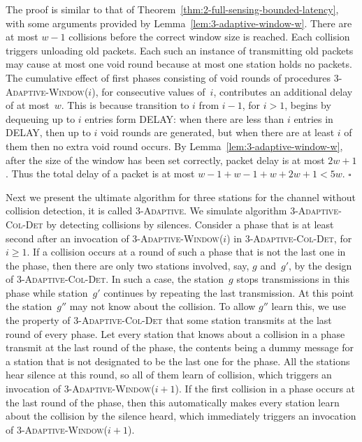 \documentclass[11pt]{article}
\newcommand{\qed}{\hfill $\square$ \smallbreak}
\newenvironment{proof}{\noindent{\bf Proof:}}{\qed}
\begin{document}
\begin{proof}
The proof is similar to that of Theorem~\ref{thm:2-full-sensing-bounded-latency}, with some arguments provided by Lemma~\ref{lem:3-adaptive-window-w}.
There are at most $w-1$ collisions before the correct window size is reached.
Each collision triggers unloading old packets.
Each such an instance of transmitting old packets may cause at most one void round because at most one station holds no packets.
The cumulative effect of first phases consisting of void rounds of procedures \textsc{3-Adaptive-Window($i$)}, for consecutive values of~$i$, contributes an additional delay of at most~$w$.
This is because transition to $i$ from $i-1$, for $i>1$, begins by dequeuing up to $i$ entries form DELAY: when there are less than $i$ entries in DELAY, then up to $i$ void rounds are generated, but when there are at least $i$ of them then no extra void round occurs.
By Lemma~\ref{lem:3-adaptive-window-w}, after the size of the window has been set correctly, packet delay is at most $2w+1$.
Thus the total delay of a packet is at most $w-1+w-1+w +2w+1 < 5w$.
\end{proof}


Next we present the ultimate algorithm for three stations for the channel without collision detection, it is called \textsc{3-Adaptive}.
We simulate algorithm \textsc{3-Adaptive-Col-Det} by detecting collisions by silences.
Consider a phase that is at least second after an invocation of \textsc{3-Adaptive-Window($i$)} in \textsc{3-Adaptive-Col-Det}, for $i\ge 1$.
If a collision occurs at a round of such a phase that is not the last one in the phase, then there are only two stations involved, say, $g$ and~$g'$, by the design of \textsc{3-Adaptive-Col-Det}.
In such a case, the station~$g$ stops transmissions in this phase while station~$g'$ continues by repeating the last transmission.
At this point the station~$g''$ may not know about the collision.
To allow $g''$ learn this, we use the property of \textsc{3-Adaptive-Col-Det} that some station transmits at the last round of every phase.
Let every station that knows about a collision in a phase transmit at the last round of the phase, the contents being a dummy message for a station that is not designated to be the last one for the phase.
All the stations hear silence at this round, so all of them learn of collision, which triggers an invocation of \textsc{3-Adaptive-Window($i+1$)}.
If the first collision in a phase occurs at the last round of the phase, then this automatically makes every station learn about the collision by the silence heard, which immediately triggers an invocation of \textsc{3-Adaptive-Window($i+1$)}.
\end{document}
